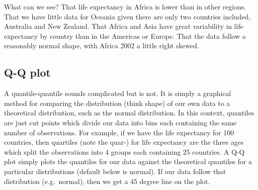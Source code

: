 \documentclass[12pt,]{krantz}
\makeatletter
\newenvironment{Shaded}{\begin{snugshade}}{\end{snugshade}}
\newcommand{\CommentTok}[1]{\textcolor[rgb]{0.56,0.35,0.01}{\textit{#1}}}
\newcommand{\DataTypeTok}[1]{\textcolor[rgb]{0.13,0.29,0.53}{#1}}
\newcommand{\DecValTok}[1]{\textcolor[rgb]{0.00,0.00,0.81}{#1}}
\newcommand{\KeywordTok}[1]{\textcolor[rgb]{0.13,0.29,0.53}{\textbf{#1}}}
\newcommand{\NormalTok}[1]{#1}
\newcommand{\OperatorTok}[1]{\textcolor[rgb]{0.81,0.36,0.00}{\textbf{#1}}}
\newcommand{\StringTok}[1]{\textcolor[rgb]{0.31,0.60,0.02}{#1}}
\newenvironment{kframe}{%
\medskip{}
\setlength{\fboxsep}{.8em}
 \def\at@end@of@kframe{}%
 \ifinner\ifhmode%
  \def\at@end@of@kframe{\end{minipage}}%
  \begin{minipage}{\columnwidth}%
 \fi\fi%
 \def\FrameCommand##1{\hskip\@totalleftmargin \hskip-\fboxsep
 \colorbox{shadecolor}{##1}\hskip-\fboxsep
     \hskip-\linewidth \hskip-\@totalleftmargin \hskip\columnwidth}%
 \MakeFramed {\advance\hsize-\width
   \@totalleftmargin\z@ \linewidth\hsize
   \@setminipage}}%
 {\par\unskip\endMakeFramed%
 \at@end@of@kframe}
\renewenvironment{Shaded}{\begin{kframe}}{\end{kframe}}
\theoremstyle{definition}
\theoremstyle{definition}
\theoremstyle{definition}
\theoremstyle{remark}
\makeatother
\begin{document}
 

What can we see? That life expectancy in Africa is lower than in other
regions. That we have little data for Oceania given there are only two
countries included, Australia and New Zealand. That Africa and Asia have
great variability in life expectancy by country than in the Americas or
Europe. That the data follow a reasonably normal shape, with Africa 2002
a little right skewed.

\hypertarget{q-q-plot}{%
\subsection{Q-Q plot}\label{q-q-plot}}

A quantile-quantile sounds complicated but is not. It is simply a
graphical method for comparing the distribution (think shape) of our own
data to a theoretical distribution, such as the normal distribution. In
this context, quantiles are just cut points which divide our data into
bins each containing the same number of observations. For example, if we
have the life expectancy for 100 countries, then quartiles (note the
quar-) for life expectancy are the three ages which split the
observations into 4 groups each containing 25 countries. A Q-Q plot
simply plots the quantiles for our data against the theoretical
quantiles for a particular distributions (default below is normal). If
our data follow that distribution (e.g.~normal), then we get a 45 degree
line on the plot.

\begin{Shaded}
\end{Shaded}
\end{document}
